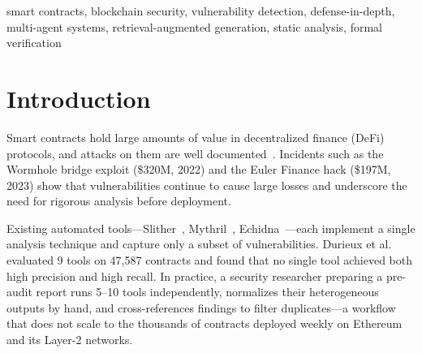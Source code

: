 \documentclass[conference]{IEEEtran}
\begin{document}
\begin{IEEEkeywords}
smart contracts, blockchain security, vulnerability detection, defense-in-depth, multi-agent systems, retrieval-augmented generation, static analysis, formal verification
\end{IEEEkeywords}

\section{Introduction}

Smart contracts hold large amounts of value in decentralized finance (DeFi) protocols, and attacks on them are well documented~\cite{atzei2017survey}. Incidents such as the Wormhole bridge exploit (\$320M, 2022) and the Euler Finance hack (\$197M, 2023) show that vulnerabilities continue to cause large losses and underscore the need for rigorous analysis before deployment.

Existing automated tools---Slither~\cite{feist2019slither}, Mythril~\cite{mueller2018smashing}, Echidna~\cite{grieco2020echidna}---each implement a single analysis technique and capture only a subset of vulnerabilities. Durieux et al.~\cite{durieux2020empirical} evaluated 9 tools on 47,587 contracts and found that no single tool achieved both high precision and high recall. In practice, a security researcher preparing a pre-audit report runs 5--10 tools independently, normalizes their heterogeneous outputs by hand, and cross-references findings to filter duplicates---a workflow that does not scale to the thousands of contracts deployed weekly on Ethereum and its Layer-2 networks.
\end{document}
